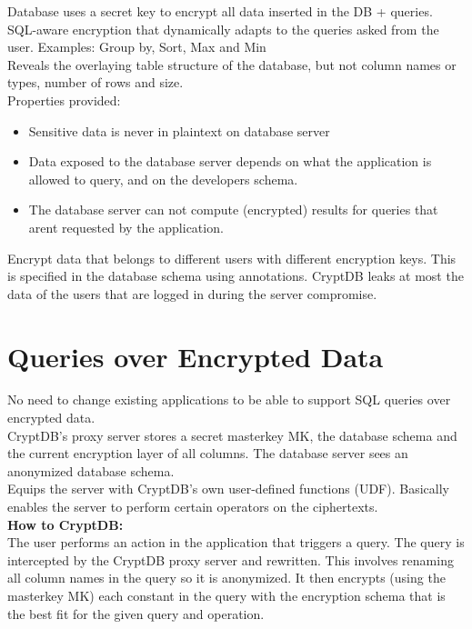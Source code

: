 \documentclass[10pt]{article}
\begin{document}
Database uses a secret key to encrypt all data inserted in the DB + queries.\\

SQL-aware encryption that dynamically adapts to the queries asked from the user. Examples: Group by, Sort, Max and Min\\

Reveals the overlaying table structure of the database, but not column names or types, number of rows and size.\\


Properties provided:

\begin{itemize}

\item Sensitive data is never in plaintext on database server
\item Data exposed to the database server depends on what the application is allowed to query, and on the developers schema.
\item The database server can not compute (encrypted) results for queries that arent requested by the application.
\end{itemize}

Encrypt data that belongs to different users with different encryption keys. This is specified in the database schema using annotations. CryptDB leaks at most the data of the users that are logged in during the server compromise.

\section{Queries over Encrypted Data}

No need to change existing applications to be able to support SQL queries over encrypted data.\\

CryptDB's proxy server stores a secret masterkey MK, the database schema and the current encryption layer of all columns. The database server sees an anonymized database schema.\\

Equips the server with CryptDB's own user-defined functions (UDF). Basically enables the server to perform certain operators on the ciphertexts.\\

\textbf{How to CryptDB:}\\
The user performs an action in the application that triggers a query. The query is intercepted by the CryptDB proxy server and rewritten. This involves renaming all column names in the query so it is anonymized. It then encrypts (using the masterkey MK) each constant in the query with the encryption schema that is the best fit for the given query and operation.
\end{document}
